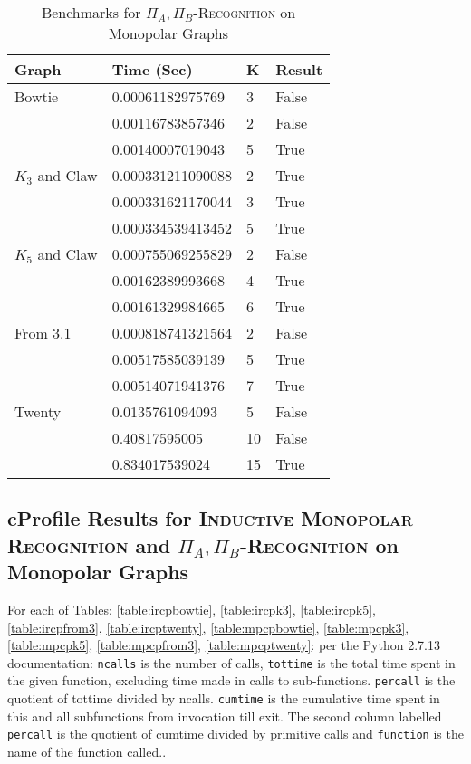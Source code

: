 \documentclass[11pt]{article}
\newcommand{\inlinecode}{\texttt}
\begin{document}
\begin{table}[ht]
\begin{center}
\begin{tabu} to 0.9\textwidth { | X[l] X[l] X[c] X[c] | }
\hline
Graph & Time (Sec) & K & Result \\
[0.5ex]
\hline
\hline
Bowtie & 0.00061182975769 & 3 & False \\
[0.3ex]
 & 0.00116783857346 & 2 & False \\
 [0.3ex]
 & 0.00140007019043 & 5 & True \\
 [0.3ex]
 \hline
$K_3$ and Claw & 0.000331211090088 & 2 & True \\
[0.3ex]
 & 0.000331621170044 & 3 & True \\
 [0.3ex]
 & 0.000334539413452 & 5 & True \\
 [0.3ex]
 \hline
$K_5$ and Claw & 0.000755069255829 & 2 & False \\
[0.3ex]
 & 0.00162389993668 & 4 & True \\
 [0.3ex]
 & 0.00161329984665 & 6 & True \\
 [0.3ex]
 \hline
From 3.1 & 0.000818741321564 & 2 & False \\
[0.3ex]
 & 0.00517585039139 & 5 & True \\
 [0.3ex]
 & 0.00514071941376 & 7 & True \\
 [0.3ex]
 \hline
Twenty & 0.0135761094093 & 5 & False \\
[0.3ex]
 & 0.40817595005 & 10 & False \\
 [0.3ex]
 & 0.834017539024 & 15 & True \\
 [0.3ex]
 \hline
\end{tabu}
\end{center}
\caption{Benchmarks for \textsc{$\Pi_A,\Pi_B$-Recognition} on Monopolar Graphs}
\label{fig:mpresults}
\end{table}

\subsection{cProfile Results for \textsc{Inductive Monopolar Recognition} and \textsc{$\Pi_A,\Pi_B$-Recognition} on Monopolar Graphs}
\label{subsec:profiles}
For each of Tables: \ref{table:ircpbowtie}, \ref{table:ircpk3}, \ref{table:ircpk5}, \ref{table:ircpfrom3}, \ref{table:ircptwenty}, \ref{table:mpcpbowtie}, \ref{table:mpcpk3}, \ref{table:mpcpk5}, \ref{table:mpcpfrom3}, \ref{table:mpcptwenty}: per the Python 2.7.13 documentation: \inlinecode{ncalls} is the number of calls, \inlinecode{tottime} is the total time spent in the given function, excluding time made in calls to sub-functions. \inlinecode{percall} is the quotient of tottime divided by ncalls. \inlinecode{cumtime}
is the cumulative time spent in this and all subfunctions from invocation till exit.
The second column labelled \inlinecode{percall} is the quotient of cumtime divided by primitive calls and \inlinecode{function} is the name of the function called.\cite{ref3}.
\end{document}
